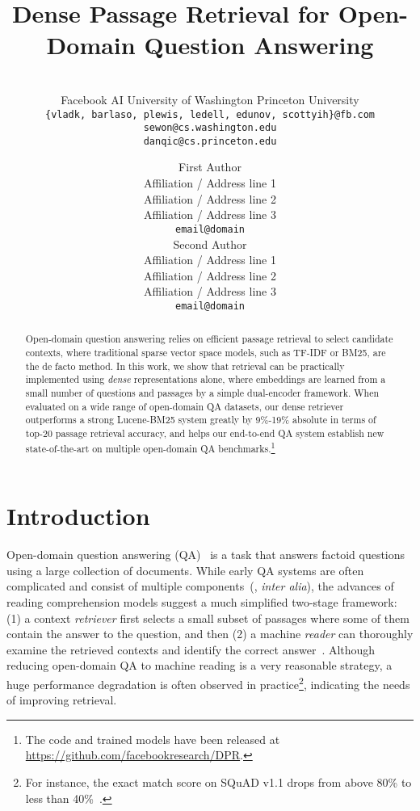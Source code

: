 \documentclass[11pt,a4paper]{article}
\title{Dense Passage Retrieval for Open-Domain Question Answering}
\author{\makecell{Vladimir Karpukhin\thanks{\hspace{.06in}Equal contribution}, Barlas O\u{g}uz\samethanks, Sewon Min, Patrick Lewis, \\ Ledell Wu, Sergey Edunov, Danqi Chen, Wen-tau Yih} \\
Facebook AI \quad\quad  University of Washington \quad\quad  Princeton University \\
\texttt{\{vladk, barlaso, plewis, ledell, edunov, scottyih\}@fb.com} \\
\texttt{sewon@cs.washington.edu} \\
\texttt{danqic@cs.princeton.edu} \\
}
\author{First Author \\
  Affiliation / Address line 1 \\
  Affiliation / Address line 2 \\
  Affiliation / Address line 3 \\
  \texttt{email@domain} \\\And
  Second Author \\
  Affiliation / Address line 1 \\
  Affiliation / Address line 2 \\
  Affiliation / Address line 3 \\
  \texttt{email@domain} \\}
\date{}
\begin{document}
\maketitle

\begin{abstract}
Open-domain question answering relies on efficient passage retrieval to select candidate contexts, where traditional sparse vector space models, such as TF-IDF or BM25, are the de facto method.
In this work, we show that retrieval can be practically implemented using \emph{dense} representations alone, where embeddings are learned from a small number of questions and passages by a simple dual-encoder framework.
When evaluated on a wide range of open-domain QA datasets, our dense retriever outperforms a strong Lucene-BM25 system greatly by 9\%-19\% absolute in terms of top-20 passage retrieval accuracy,
and helps our end-to-end QA system establish new state-of-the-art on multiple open-domain QA benchmarks.\footnote{The code and trained models have been released at \href{https://github.com/facebookresearch/DPR}{https://github.com/facebookresearch/DPR}.}


\end{abstract}



\section{Introduction}

\label{sec:intro}


Open-domain question answering (QA)~\cite{voorhees1999trec} is a task that answers factoid questions using a large collection of documents.
While early QA systems are often complicated and consist of multiple components~(\citet{ferrucci2012introduction,moldovan2003performance}, \textit{inter alia}),
the advances of reading comprehension models suggest a much simplified two-stage framework: (1) a context \emph{retriever} first selects a small subset of passages where some of them contain the answer to the question, and then (2) a machine \emph{reader} can thoroughly examine the retrieved contexts and identify the correct answer~\cite{chen2017reading}.
Although reducing open-domain QA to machine reading is a very reasonable strategy, a huge performance degradation is often observed in practice\footnote{For instance,
the exact match score on SQuAD v1.1 drops from above 80\% to less than 40\%~\cite{yang2019end}.}, indicating the needs of improving retrieval.
\end{document}
